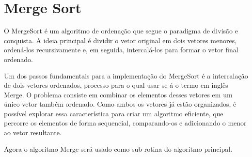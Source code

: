 \section{Merge Sort}
O MergeSort é um algoritmo de ordenação que segue o paradigma de divisão e conquista. A ideia principal é dividir o vetor original em dois vetores menores, ordená-los recursivamente e, em seguida, intercalá-los para formar o vetor final ordenado.

Um dos passos fundamentais para a implementação do MergeSort é a intercalação de dois vetores ordenados, processo para o qual usar-se-á o termo em inglês Merge. O problema consiste em combinar os elementos desses vetores em um único vetor também ordenado. Como ambos os vetores já estão organizados, é possível explorar essa característica para criar um algoritmo eficiente, que percorre os elementos de forma sequencial, comparando-os e adicionando o menor ao vetor resultante.



Agora o algoritmo Merge será usado como sub-rotina do algoritmo principal.




